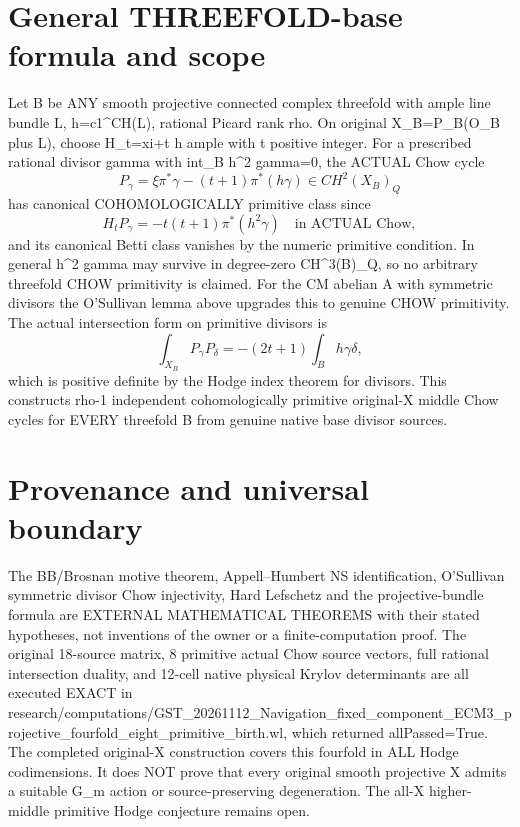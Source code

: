 \documentclass[11pt]{article}
\begin{document}
\section{General THREEFOLD-base formula and scope}
Let B be ANY smooth projective connected
complex threefold with ample line bundle
L, h=c1^CH(L), rational Picard rank rho.
On original X_B=P_B(O_B plus L), choose
H_t=xi+t h ample with t positive integer.
For a prescribed rational divisor gamma
with int_B h^2 gamma=0, the ACTUAL Chow cycle
\[
\boxed{P_\gamma=\xi\pi^*\gamma
-(t+1)\pi^*(h\gamma)\in CH^2(X_B)_Q}
\]
has canonical COHOMOLOGICALLY primitive class
since
\[
H_t P_\gamma=-t(t+1)\pi^*(h^2\gamma)
\quad\text{in ACTUAL Chow},
\]
and its canonical Betti class vanishes by the
numeric primitive condition.
In general h^2 gamma may survive in
degree-zero CH^3(B)_Q, so no arbitrary
threefold CHOW primitivity is claimed.
For the CM abelian A with symmetric
divisors the O'Sullivan lemma above
upgrades this to genuine CHOW primitivity.
The actual intersection form on primitive
divisors is
\[
\boxed{
\int_{X_B}P_\gamma P_\delta
=-(2t+1)\int_B h\gamma\delta,}
\]
which is positive definite by the
Hodge index theorem for divisors.
This constructs rho-1 independent
cohomologically primitive original-X
middle Chow cycles for EVERY threefold B
from genuine native base divisor sources.

\section{Provenance and universal boundary}
The BB/Brosnan motive theorem, Appell--Humbert NS
identification, O'Sullivan symmetric divisor
Chow injectivity, Hard Lefschetz and
the projective-bundle formula are
EXTERNAL MATHEMATICAL THEOREMS with their
stated hypotheses, not inventions of
the owner or a finite-computation proof.
The original 18-source matrix, 8 primitive
actual Chow source vectors, full rational
intersection duality, and 12-cell native
physical Krylov determinants are all
executed EXACT in
research/computations/GST_20261112_Navigation_fixed_component_ECM3_projective_fourfold_eight_primitive_birth.wl,
which returned allPassed=True.
The completed original-X construction
covers this fourfold in ALL Hodge codimensions.
It does NOT prove that every original
smooth projective X admits a suitable
G_m action or source-preserving
degeneration. The all-X higher-middle
primitive Hodge conjecture remains open.
\end{document}
